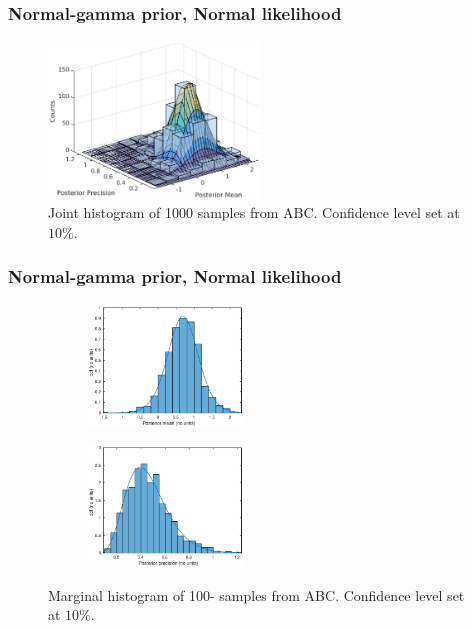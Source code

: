 \documentclass{beamer}
\begin{document}
\begin{frame}
\frametitle{Normal-gamma prior, Normal likelihood}
\begin{figure}
\includegraphics[width=0.5\textwidth]{surf.eps}
\caption{Joint histogram of 1000 samples from ABC. Confidence level set at $10\%$.}
\label{surf}
\end{figure}
\end{frame}

\begin{frame}
\frametitle{Normal-gamma prior, Normal likelihood}
\begin{figure}
\centering
\begin{subfigure}
\centering
\includegraphics[width=0.45\textwidth]{mean.eps}
\end{subfigure}
\begin{subfigure}
\centering
\includegraphics[width=0.45\textwidth]{precision.eps}
\end{subfigure}
\caption{Marginal histogram of 100- samples from ABC. Confidence level set at $10\%$.}
\end{figure}
\end{frame}
\end{document}
